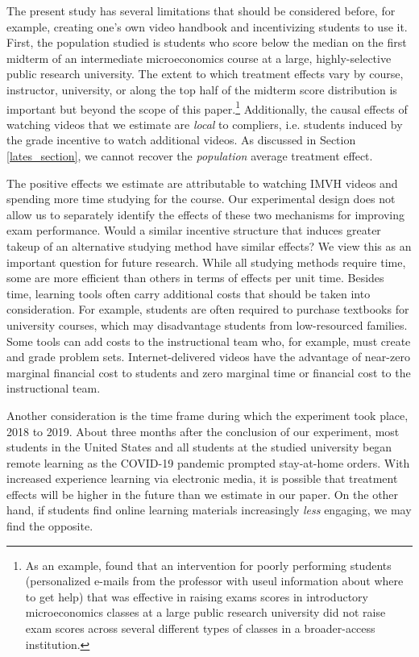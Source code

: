 \documentclass[12pt]{article}
\begin{document}
The present study has several limitations that should be considered before, for example, creating one's own video handbook and incentivizing students to use it. First, the population studied is students who score below the median on the first midterm of an intermediate microeconomics course at a large, highly-selective public research university. The extent to which treatment effects vary by course, instructor, university, or along the top half of the midterm score distribution is important but beyond the scope of this paper.\footnote{As an example, \textcite{ck2020} found that an intervention for poorly performing students (personalized e-mails from the professor with useul information about where to get help) that was effective in raising exams scores in introductory microeconomics classes at a large public research university did not raise exam scores across several different types of classes in a broader-access institution.} Additionally, the causal effects of watching videos that we estimate are \textit{local} to compliers, i.e. students induced by the grade incentive to watch additional videos. As discussed in Section \ref{lates_section}, we cannot recover the \textit{population} average treatment effect.

The positive effects we estimate are attributable to watching IMVH videos and spending more time studying for the course. Our experimental design does not allow us to separately identify the effects of these two mechanisms for improving exam performance. Would a similar incentive structure that induces greater takeup of an alternative studying method have similar effects? We view this as an important question for future research. While all studying methods require time, some are more efficient than others in terms of effects per unit time. Besides time, learning tools often carry additional costs that should be taken into consideration. For example, students are often required to purchase textbooks for university courses, which may disadvantage students from low-resourced families. Some tools can add costs to the instructional team who, for example, must create and grade problem sets. Internet-delivered videos have the advantage of near-zero marginal financial cost to students and zero marginal time or financial cost to the instructional team.

Another consideration is the time frame during which the experiment took place, 2018 to 2019. About three months after the conclusion of our experiment, most students in the United States and all students at the studied university began remote learning as the COVID-19 pandemic prompted stay-at-home orders. With increased experience learning via electronic media, it is possible that treatment effects will be higher in the future than we estimate in our paper. On the other hand, if students find online learning materials increasingly \textit{less} engaging, we may find the opposite.
\end{document}
